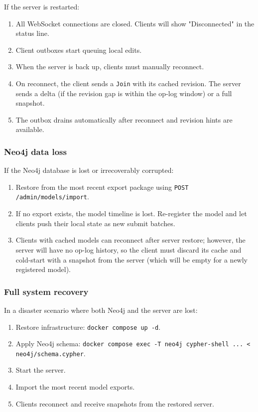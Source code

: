 If the server is restarted:

\begin{enumerate}
\item All WebSocket connections are closed. Clients will show
  "Disconnected" in the status line.
\item Client outboxes start queuing local edits.
\item When the server is back up, clients must manually reconnect.
\item On reconnect, the client sends a \texttt{Join} with its cached
  revision. The server sends a delta (if the revision gap is within the
  op-log window) or a full snapshot.
\item The outbox drains automatically after reconnect and revision hints
  are available.
\end{enumerate}

\subsubsection{Neo4j data loss}

If the Neo4j database is lost or irrecoverably corrupted:

\begin{enumerate}
\item Restore from the most recent export package using
  \texttt{POST /admin/models/import}.
\item If no export exists, the model timeline is lost. Re-register the
  model and let clients push their local state as new submit batches.
\item Clients with cached models can reconnect after server restore;
  however, the server will have no op-log history, so the client must
  discard its cache and cold-start with a snapshot from the server (which
  will be empty for a newly registered model).
\end{enumerate}

\subsubsection{Full system recovery}

In a disaster scenario where both Neo4j and the server are lost:

\begin{enumerate}
\item Restore infrastructure: \texttt{docker compose up -d}.
\item Apply Neo4j schema: \texttt{docker compose exec -T neo4j cypher-shell ... < neo4j/schema.cypher}.
\item Start the server.
\item Import the most recent model exports.
\item Clients reconnect and receive snapshots from the restored server.
\end{enumerate}


